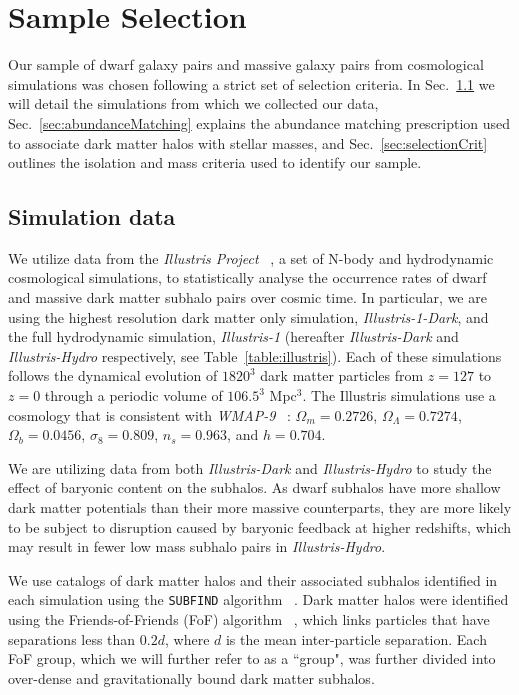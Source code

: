 \documentclass[twocolumn]{aastex63}
\begin{document}
\section{Sample Selection} \label{sec:methods}
Our sample of dwarf galaxy pairs and massive galaxy pairs from cosmological simulations was chosen following a strict set of selection criteria. In Sec.~\ref{sec:simData} we will detail the simulations from which we collected our data, Sec.~\ref{sec:abundanceMatching} explains the abundance matching prescription used to associate dark matter halos with stellar masses, and Sec.~\ref{sec:selectionCrit} outlines the isolation and mass criteria used to identify our sample. 

\subsection{Simulation data}\label{sec:simData}
We utilize data from the \textit{Illustris Project} ~\citep{vogelsberger14A,nelson15}, a set of N-body and hydrodynamic cosmological simulations, to statistically analyse the occurrence rates of dwarf and massive dark matter subhalo pairs over cosmic time. In particular, we are using the highest resolution dark matter only simulation, \textit{Illustris-1-Dark}, and the  full hydrodynamic simulation, \textit{Illustris-1} (hereafter \textit{Illustris-Dark} and \textit{Illustris-Hydro} respectively, see Table~\ref{table:illustris}).
Each of these simulations follows the dynamical evolution of $1820^3$ dark matter particles from $z=127$ to $z=0$ through a periodic volume of $106.5^3$ Mpc$^3$. The Illustris simulations use a cosmology that is consistent with \textit{WMAP-9} ~\citep{hinshaw13}: $\Omega_m = 0.2726$, $\Omega_\Lambda = 0.7274$, $\Omega_b = 0.0456$, $\sigma_8 = 0.809$, $n_s=0.963$, and $h=0.704$.

We are utilizing data from both \textit{Illustris-Dark} and \textit{Illustris-Hydro} to study the effect of baryonic content on the subhalos. As dwarf subhalos have more shallow dark matter potentials than their more massive counterparts, they are more likely to be subject to disruption caused by baryonic feedback at higher redshifts, which may result in fewer low mass subhalo pairs in \textit{Illustris-Hydro}. 

We use catalogs of dark matter halos and their associated subhalos identified in each simulation using the \texttt{SUBFIND} algorithm ~\citep{springel01,dolag09}. Dark matter halos were identified using the Friends-of-Friends (FoF) algorithm ~\citep{davis85}, which links particles that have separations less than $0.2d$, where $d$ is the mean inter-particle separation. Each FoF group, which we will further refer to as a ``group", was further divided into over-dense and gravitationally bound dark matter subhalos.
\end{document}
